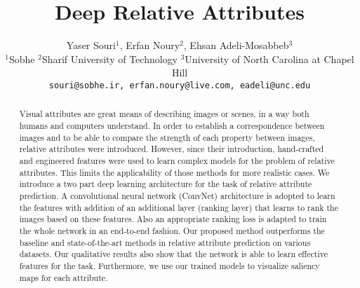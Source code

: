 \documentclass[10pt,twocolumn,letterpaper]{article}
\begin{document}
\title{Deep Relative Attributes}

\author{Yaser Souri$^1$, Erfan Noury$^2$, Ehsan Adeli-Mosabbeb$^3$\\
$^1$Sobhe \quad $^2$Sharif University of Technology \quad $^3$University of North Carolina at Chapel Hill\\
{\tt\small souri@sobhe.ir, erfan.noury@live.com, eadeli@unc.edu}
}

\maketitle

\begin{abstract}
Visual attributes are great means of describing images or scenes, in a way both humans and computers understand. In order to establish a correspondence between images and to be able to compare the strength of each property between images, relative attributes were introduced. However, since their introduction, hand-crafted and engineered features were used to learn complex models for the problem of relative attributes. This limits the applicability of those methods for more realistic cases.
We introduce a two part deep learning architecture for the task of relative attribute prediction.
A convolutional neural network (ConvNet) architecture is adopted to learn the features with addition of an additional layer (ranking layer) that learns to rank the images based on these features. Also an appropriate ranking loss is adapted to train the whole network in an end-to-end fashion.
Our proposed method outperforms the baseline and state-of-the-art methods in relative attribute prediction on various datasets. Our qualitative results also show that the network is able to learn effective features for the task. Furthermore, we use our trained models to visualize saliency maps for each attribute.
\end{abstract}








{\small


}
\end{document}
